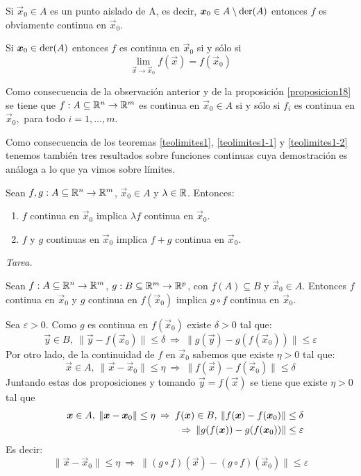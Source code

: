 \begin{nota}
Si $\vec{x}_0\in A$ es un punto aislado de A, es decir, $\vec{x}_0\in A\setminus \der{A}$ 
entonces $f$ es obviamente continua en $\vec{x}_0$.

Si $\vec{x}_0\in \der{A}$ entonces $f$ es continua en $\vec{x}_0$ si y s\'olo si
$$\lim_{\vec{x}\to \vec{x}_0}f(\vec{x})=f(\vec{x}_0)$$
\end{nota}

Como consecuencia de la observaci\'on anterior y de la proposici\'on \ref{proposicion18} se tiene que $f:A\subseteq\R^n\to\R^m$ es continua en $\vec{x}_0\in A$ si y s\'olo si $f_i$ es continua en $\vec{x}_0,$ para todo $i=1,\ldots,m.$

Como consecuencia de los teoremas \ref{teolimites1}, \ref{teolimites1-1} y \ref{teolimites1-2} tenemos tambi\'en tres resultados sobre funciones continuas cuya demostraci\'on es an\'aloga a lo que ya vimos sobre l\'imites.

\begin{teorema}\label{teolimites2} 
Sean $f,g:A\subseteq\R^n\to\R^m$, $\vec{x}_0\in A$ y $\lambda\in\R$. Entonces:
\begin{enumerate}
\item $f$ continua en $\vec{x}_0$ implica $\lambda f$ continua en $\vec{x}_0$.
\item $f$ y $g$ continuas en $\vec{x}_0$ implica $f+g$ continua en $\vec{x}_0$.
\end{enumerate}
\end{teorema} 

\begin{demostracion}
\emph{Tarea.}
\end{demostracion}

\begin{teorema}\label{teolimites2-1} 
Sean $f:A\subseteq\R^n\to\R^m$, $g:B\subseteq \R^m \to \R^p$, con $f(A)\subseteq B$ y $\vec{x}_0\in A$. Entonces $f$ continua en $\vec{x}_0$ y $g$ continua en $f(\vec{x}_0)$ implica $g\circ f$ continua en $\vec{x}_0$.
\end{teorema} 

\begin{demostracion} 
Sea $\varepsilon>0.$ Como $g$ es continua en 
$f(\vec{x}_0)$ existe $\delta>0$ tal que: 
$$ \vec{y}\in B,\:\|\vec{y}-f(\vec{x}_0)\|\leq \delta \:\Rightarrow\: \|g(\vec{y})-g(f(\vec{x}_0))\|\leq \varepsilon$$
Por otro lado, de la continuidad de $f$ en $\vec{x}_0$ sabemos que existe 
$\eta>0$ tal que:
$$\vec{x}\in A,\: \|\vec{x}-\vec{x}_0\|\leq \eta\:\Rightarrow\:\|f(\vec{x})-f(\vec{x}_0)\|\leq \delta$$
Juntando estas dos proposiciones y tomando $\vec{y}=f(\vec{x})$ se tiene que existe $\eta>0$
tal que
\begin{eqnarray*}
& & \vec{x}\in A,\: \|\vec{x}-\vec{x}_0\|\leq \eta\:\Rightarrow\: f(\vec{x})\in B,\: 
\|f(\vec{x})-f(\vec{x}_0)\|\leq \delta \cr
& & \Rightarrow\:\|g(f(\vec{x}))-g(f(\vec{x}_0))\|\leq \varepsilon
\end{eqnarray*}
Es decir:$$\|\vec{x}-\vec{x}_0\|\leq \eta\:\Rightarrow\:\|(g\circ f)(\vec{x})-(g\circ f)(\vec{x}_0)\|\leq \varepsilon $$
\end{demostracion}

